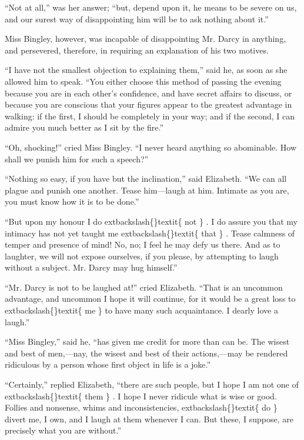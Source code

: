 \documentclass[10pt]{book}
\begin{document}
   “Not at all,” was her answer; “but, depend upon it, he means to be
severe on us, and our surest way of disappointing him will be to ask
nothing about it.”
  

   Miss Bingley, however, was incapable of disappointing Mr. Darcy in
anything, and persevered, therefore, in requiring an explanation of his
two motives.
  

   “I have not the smallest objection to explaining them,” said he, as soon
as she allowed him to speak. “You either choose this method of passing
the evening because you are in each other’s confidence, and have secret
affairs to discuss, or because you are conscious that your figures
appear to the greatest advantage in walking: if the first, I should be
completely in your way; and if the second, I can admire you much better
as I sit by the fire.”
  

   “Oh, shocking!” cried Miss Bingley. “I never heard
   anything so
abominable. How shall we punish him for such a speech?”
  

   “Nothing so easy, if you have but the inclination,” said Elizabeth. “We
can all plague and punish one another. Tease him—laugh at him. Intimate
as you are, you must know how it is to be done.”
  

   “But upon my honour I do
   	extbackslash\{\}textit\{
    not
   \}
   . I do assure you that my intimacy has not
yet taught me
   	extbackslash\{\}textit\{
    that
   \}
   . Tease calmness of temper and presence of mind! No,
no; I feel he may defy us there. And as to laughter, we will not expose
ourselves, if you please, by attempting to laugh without a subject. Mr.
Darcy may hug himself.”
  

   “Mr. Darcy is not to be laughed at!” cried Elizabeth. “That is an
uncommon advantage, and uncommon I hope it will continue, for it would
be a great loss to
   	extbackslash\{\}textit\{
    me
   \}
   to have many such acquaintance. I dearly love a
laugh.”
  

   “Miss Bingley,” said he, “has given me credit for more than can be. The
wisest and best of men,—nay, the wisest and best of their actions,—may
be rendered ridiculous by a person whose first object in life is a
joke.”
  

   “Certainly,” replied Elizabeth, “there are such people, but I hope I am
not one of
   	extbackslash\{\}textit\{
    them
   \}
   . I hope I never ridicule what is wise or good. Follies
and nonsense, whims and inconsistencies,
   	extbackslash\{\}textit\{
    do
   \}
   divert me, I own, and I
laugh at them whenever I can. But these, I suppose, are precisely what
you are without.”
  
\end{document}
